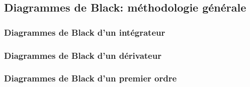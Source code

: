 %    
\newpage
\subsection{Diagrammes de Black: méthodologie générale}

\subsubsection{Diagrammes de Black d'un intégrateur}

\subsubsection{Diagrammes de Black d'un dérivateur}

\subsubsection{Diagrammes de Black d'un premier ordre}

